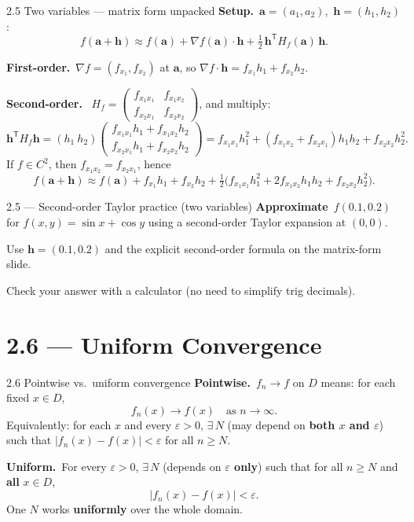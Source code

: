 \documentclass[11pt,aspectratio=169]{beamer}
\newcommand{\HessianSkip}{{\small\textcolor{mAccent}{ignore if you are not familiar with what's Hessian}}}
\begin{document}
\begin{frame}{2.5 Two variables --- matrix form unpacked \quad \HessianSkip}
  \footnotesize
  \textbf{Setup.}\ $\mathbf{a}=(a_1,a_2)$,\ $\mathbf{h}=(h_1,h_2)$:
  \[
    f(\mathbf{a}+\mathbf{h})
    \approx f(\mathbf{a})
      + \nabla f(\mathbf{a})\cdot\mathbf{h}
      + \tfrac12\,\mathbf{h}^{\mathsf T}H_f(\mathbf{a})\,\mathbf{h}.
  \]

  \medskip
  \textbf{First-order.}\
  $\nabla f=(f_{x_1},f_{x_2})$ at $\mathbf{a}$, so
  $\nabla f\cdot\mathbf{h}=f_{x_1}h_1+f_{x_2}h_2$.

  \medskip
  \textbf{Second-order.}\
  {\scriptsize
  $H_f=
  \begin{pmatrix}f_{x_1x_1}&f_{x_1x_2}\\f_{x_2x_1}&f_{x_2x_2}\end{pmatrix}$,
  }
  and multiply:
  {\scriptsize
  \[
    \mathbf{h}^{\mathsf T}H_f\mathbf{h}
    = (h_1\ h_2)
      \begin{pmatrix}f_{x_1x_1}h_1+f_{x_1x_2}h_2\\
                     f_{x_2x_1}h_1+f_{x_2x_2}h_2\end{pmatrix}
    = f_{x_1x_1}h_1^2 + (f_{x_1x_2}+f_{x_2x_1})h_1h_2 + f_{x_2x_2}h_2^2.
  \]
  }
  If $f\in C^2$, then $f_{x_1x_2}=f_{x_2x_1}$, hence
  \[
    f(\mathbf{a}+\mathbf{h})
    \approx f(\mathbf{a})
      + f_{x_1}h_1 + f_{x_2}h_2
      + \tfrac12\bigl(
        f_{x_1x_1}h_1^2 + 2f_{x_1x_2}h_1h_2 + f_{x_2x_2}h_2^2
      \bigr).
  \]
\end{frame}

\begin{frame}{2.5 --- Second-order Taylor practice (two variables) \quad {\small\textcolor{mAccent}{Take home}} \quad \HessianSkip}
  \footnotesize
  \textbf{Approximate}\ $f(0.1,0.2)$ for $f(x,y)=\sin x+\cos y$ using a second-order Taylor expansion at $(0,0)$.

  \medskip
  Use $\mathbf{h}=(0.1,0.2)$ and the explicit second-order formula on the matrix-form slide.

  \medskip
  {\scriptsize Check your answer with a calculator (no need to simplify trig decimals).}
\end{frame}

\section{2.6 --- Uniform Convergence}

\begin{frame}{2.6 Pointwise vs.\ uniform convergence}
  \footnotesize
  \textbf{Pointwise.}\ $f_n\to f$ on $D$ means: for each fixed $x\in D$,
  \[
    f_n(x)\to f(x)\quad\text{as }n\to\infty.
  \]
  Equivalently: for each $x$ and every $\varepsilon>0$, $\exists\,N$ (may depend on
  \textbf{both $x$ and $\varepsilon$}) such that $|f_n(x)-f(x)|<\varepsilon$ for all $n\ge N$.

  \medskip
  \textbf{Uniform.}\ For every $\varepsilon>0$, $\exists\,N$ (depends on \textbf{$\varepsilon$ only})
  such that for all $n\ge N$ and \textbf{all} $x\in D$,
  \[
    |f_n(x)-f(x)|<\varepsilon.
  \]
  One $N$ works \textbf{uniformly} over the whole domain.
\end{frame}
\end{document}

